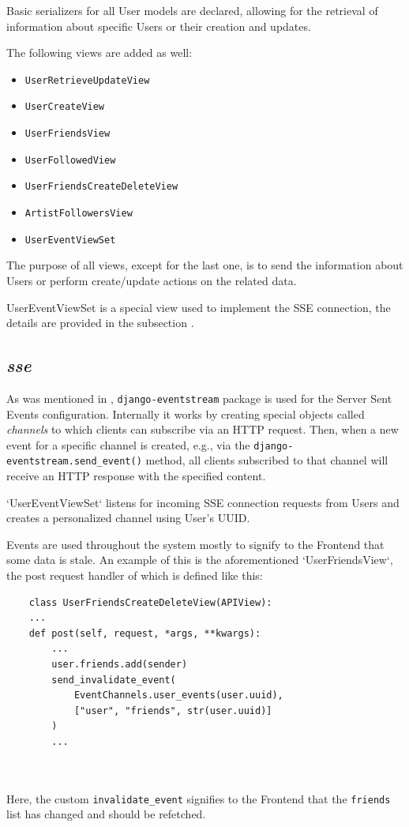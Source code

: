 Basic serializers for all User models are declared,
allowing for the retrieval of information about specific Users or their creation and updates.

The following views are added as well:
\begin{itemize}
    \item \texttt{UserRetrieveUpdateView}
    \item \texttt{UserCreateView}
    \item \texttt{UserFriendsView}
    \item \texttt{UserFollowedView}
    \item \texttt{UserFriendsCreateDeleteView}
    \item \texttt{ArtistFollowersView}
    \item \texttt{UserEventViewSet}
\end{itemize}

The purpose of all views, except for the last one, is to send the information
about Users or perform create/update actions on the related data.

UserEventViewSet is a special view used to implement the SSE connection,
the details are provided in the subsection .

\subsection{\textit{sse}}\label{sec:sse}
As was mentioned in , \texttt{django-eventstream} package is used for the Server Sent Events
configuration. Internally it works by creating special objects called \textit{channels} to which clients can subscribe
via an HTTP request. Then, when a new event for a specific channel is created,
e.g., via the \texttt{django-eventstream.send\_event()} method, all clients subscribed to that channel
will receive an HTTP response with the specified content.

`UserEventViewSet` listens for incoming SSE connection requests from Users and creates a personalized channel using User's UUID.

Events are used throughout the system mostly to signify to the Frontend that some data is stale.
An example of this is the aforementioned `UserFriendsView`, the post request handler of which is defined like this:

\begin{minipage}{\textwidth}
    \begin{verbatim}
    class UserFriendsCreateDeleteView(APIView):
    ...
    def post(self, request, *args, **kwargs):
        ...
        user.friends.add(sender)
        send_invalidate_event(
            EventChannels.user_events(user.uuid),
            ["user", "friends", str(user.uuid)]
        )
        ...
    \end{verbatim}
\end{minipage}
\\
\\
Here, the custom \texttt{invalidate\_event} signifies to the Frontend that the \texttt{friends}
list has changed and should be refetched.

